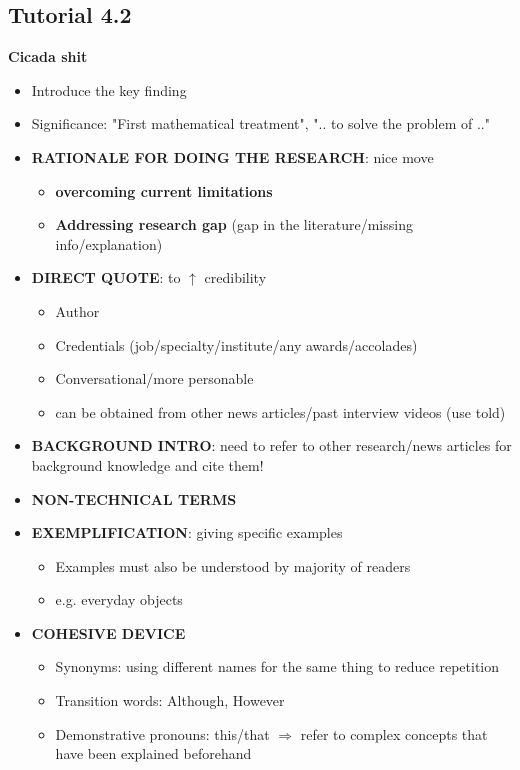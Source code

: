 \documentclass{article}
\begin{document}
\begin{multicols}{2}
\subsection{Tutorial 4.2}
\textbf{Cicada shit}
\begin{itemize}
	\item Introduce the key finding
	\item Significance: "First mathematical treatment", ".. to solve the problem of .."
	\item \textbf{RATIONALE FOR DOING THE RESEARCH}: nice move
	\begin{itemize}
		\item \textbf{overcoming current limitations}
		\item \textbf{Addressing research gap} (gap in the literature/missing info/explanation)
	\end{itemize}
    \item \textbf{DIRECT QUOTE}: to $\uparrow$ credibility
    \begin{itemize}
    	\item Author
    	\item Credentials (job/specialty/institute/any awards/accolades)
    	\item Conversational/more personable
    	\item can be obtained from other news articles/past interview videos (use told)
    \end{itemize}
	\item \textbf{BACKGROUND INTRO}: need to refer to other research/news articles for background knowledge and cite them!
	\item \textbf{NON-TECHNICAL TERMS}
	\item \textbf{EXEMPLIFICATION}: giving specific examples
	\begin{itemize}
		\item Examples must also be understood by majority of readers
		\item e.g. everyday objects
	\end{itemize}
	\item \textbf{COHESIVE DEVICE}
	\begin{itemize}
		\item Synonyms: using different names for the same thing to reduce repetition
		\item Transition words: Although, However
		\item Demonstrative pronouns: this/that $\Rightarrow$ refer to complex concepts that have been explained beforehand
	\end{itemize}

\end{itemize}
\end{multicols}
\end{document}
